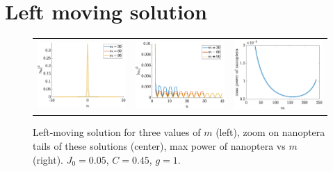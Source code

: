 \documentclass{article}
\begin{document}
\section{Left moving solution}

\begin{figure}[H]
    \centering
    \begin{tabular}{ccc}
    \includegraphics[width=5cm]{leftm} &
    \includegraphics[width=5cm]{leftmnanop} &
    \includegraphics[width=5cm]{leftnanopmax} \\
    \end{tabular}
    \caption{Left-moving solution for three values of $m$ (left), zoom on nanoptera tails of these solutions (center), max power of nanoptera vs $m$ (right). $J_0 = 0.05$, $C = 0.45$, $g=1$.}
    \label{fig:left1}
\end{figure}
\end{document}
